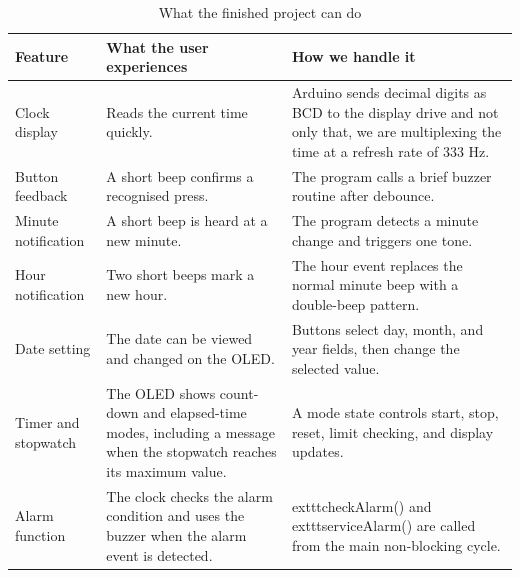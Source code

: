 \documentclass[12pt,letterpaper]{article}
\begin{document}
\begin{table}[H]

  \centering

  \caption{What the finished project can do}

  \label{tab:features}

  \begin{tabularx}{
    \textwidth
  }{
    @{}p{34mm}Y Y@{}
  }

    \toprule

    \textbf{Feature}
    &
    \textbf{What the user experiences}
    &
    \textbf{How we handle it}
    \\

    \midrule

    Clock display
    &
    Reads the current time quickly.
    &
    Arduino sends decimal digits as BCD
    to the display drive and not only that, 
    we are multiplexing the time at a refresh rate of 333 Hz.
    \\

    Button feedback
    &
    A short beep confirms a recognised press.
    &
    The program calls a brief buzzer routine
    after debounce.
    \\

    Minute notification
    &
    A short beep is heard at a new minute.
    &
    The program detects a minute change
    and triggers one tone.
    \\

    Hour notification
    &
    Two short beeps mark a new hour.
    &
    The hour event replaces the normal
    minute beep with a double-beep pattern.
    \\

    Date setting
    &
    The date can be viewed and changed on the OLED.
    &
    Buttons select day, month, and year fields,
    then change the selected value.
    \\

    Timer and stopwatch
    &
    The OLED shows count-down and elapsed-time modes, including
    a message when the stopwatch reaches its maximum value.
    &
    A mode state controls start, stop,
    reset, limit checking, and display updates.
    \\

    Alarm function
    &
    The clock checks the alarm condition and uses the buzzer
    when the alarm event is detected.
    &
    	exttt{checkAlarm()} and 	exttt{serviceAlarm()} are called
    from the main non-blocking cycle.
    \\


\end{tabularx}
\end{table}
\end{document}
